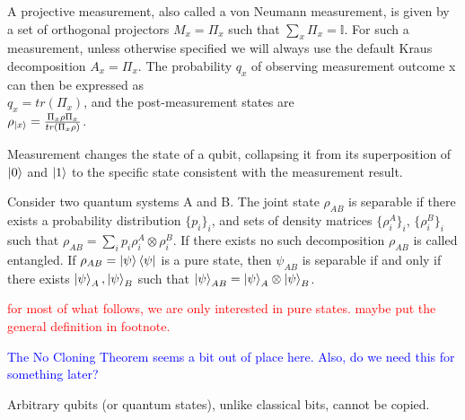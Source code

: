 \begin{definition} \label{projective measurement}
A projective measurement, also called a von Neumann measurement, is given by a set of orthogonal projectors $M_x=\Pi_x$ such that $\sum_x \Pi_x=\mathbb{I}$. For such a measurement, unless otherwise specified we will always use the default Kraus decomposition $A_x=\Pi_x$. The probability $q_x$ of observing measurement outcome x can then be expressed as\\
$q_x=tr(\Pi_x)$,
and the post-measurement states are \\
$\rho_{\ket{x}}=\frac{\Pi_x \rho \Pi_x}{tr(\Pi_x \rho)}$.
\end{definition}




Measurement changes the state of a qubit, collapsing it from its superposition of $\ket{0}$ and $\ket{1}$ to the specific state consistent with the measurement result.  



\begin{definition}[Entanglement]
 Consider two quantum systems A and B. The joint state $\rho_{AB}$ is separable if there exists a probability distribution $\{p_i\}_i$, and sets of density matrices $\{\rho_i^A\}_i$, $\{\rho_i^B\}_i$ such that $\rho_{AB}=\sum_i p_i\rho_i^A\otimes\rho_i^B$.
 If there exists no such decomposition $\rho_{AB}$ is called entangled.
 If $\rho_{AB}=\ket{\psi}\bra{\psi}$ is a pure state, then $\psi_{AB}$ is separable if and only if there exists $\ket{\psi}_A, \ket{\psi}_B$ such that $\ket{\psi}_{AB}=\ket{\psi}_A \otimes \ket{\psi}_B$.
\end{definition}

\textcolor{red}{for most of what follows, we are only interested in pure states. maybe put the general definition in footnote.}

\textcolor{blue}{The No Cloning Theorem seems a bit out of place here.  Also, do we need this for something later?}
\begin{theorem} \label{no-cloning thm}
Arbitrary qubits (or quantum states), unlike classical bits, cannot be copied. 
\end{theorem} 

